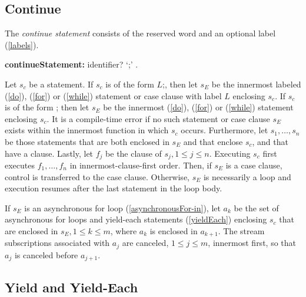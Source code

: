 \documentclass{article}
\newcommand{\code}[1]{{\sf #1}}
\begin{document}
\subsection{ Continue}

\LMHash{}
The {\em continue statement} consists of the reserved word \CONTINUE{} and an optional label (\ref{labels}).

\begin{grammar}
{\bf continueStatement:}
    \CONTINUE{} identifier? `{\escapegrammar ;}'
        .
 \end{grammar}

\LMHash{}
 Let $s_c$ be a \CONTINUE{} statement. If $s_c$ is of the form  \code{\CONTINUE{} $L$;}, then let $s_E$ be the innermost labeled \DO{} (\ref{do}), \FOR{} (\ref{for}) or \WHILE{} (\ref{while}) statement or case clause with label $L$ enclosing $s_c$. If $s_c$ is of the form \code{\CONTINUE{};}  then let $s_E$ be the innermost  \DO{} (\ref{do}), \FOR{} (\ref{for}) or \WHILE{} (\ref{while}) statement enclosing  $s_c$. It is a compile-time error if no such statement or case clause $s_E$ exists within the innermost function in which  $s_c$ occurs.  Furthermore, let $s_1, \ldots, s_n$ be those \TRY{} statements that are both enclosed in $s_E$ and that enclose  $s_c$, and that have a \FINALLY{} clause. Lastly, let $f_j$ be the \FINALLY{} clause of $s_j, 1 \le j \le n$.   Executing  $s_c$ first executes $f_1, \ldots,  f_n$ in innermost-clause-first  order. Then, if $s_E$ is a case clause, control is transferred to the case clause. Otherwise, $s_E$ is necessarily a loop and execution resumes after the last statement in the loop body.


\LMHash{}
 If $s_E$ is an asynchronous for loop (\ref{asynchronousFor-in}), let $a_k$ be the set of asynchronous for loops and yield-each statements (\ref{yieldEach}) enclosing $s_c$ that are enclosed in $s_E , 1 \le k \le m$, where $a_k$ is enclosed in $a_{k+1}$.   The stream subscriptions associated with $a_j$ are canceled, $1 \le j \le m$, innermost first, so that $a_j$ is canceled before $a_{j+1}$.

 \subsection{ Yield and Yield-Each}
\end{document}
